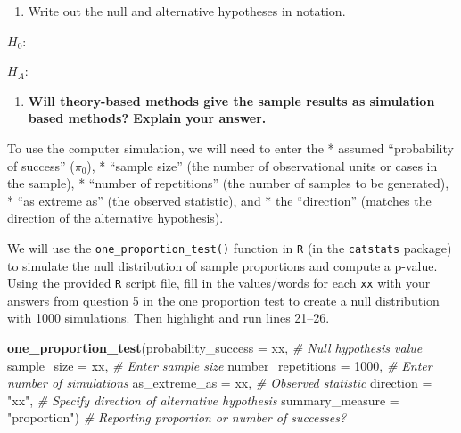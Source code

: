\documentclass[
]{report}
\newenvironment{Shaded}{\begin{snugshade}}{\end{snugshade}}
\newcommand{\AttributeTok}[1]{\textcolor[rgb]{0.13,0.29,0.53}{#1}}
\newcommand{\CommentTok}[1]{\textcolor[rgb]{0.56,0.35,0.01}{\textit{#1}}}
\newcommand{\DecValTok}[1]{\textcolor[rgb]{0.00,0.00,0.81}{#1}}
\newcommand{\FunctionTok}[1]{\textcolor[rgb]{0.13,0.29,0.53}{\textbf{#1}}}
\newcommand{\NormalTok}[1]{#1}
\newcommand{\StringTok}[1]{\textcolor[rgb]{0.31,0.60,0.02}{#1}}
\providecommand{\tightlist}{%
  \setlength{\itemsep}{0pt}\setlength{\parskip}{0pt}}
\begin{document}
\vspace{0.5in}

\begin{enumerate}
\def\labelenumi{\arabic{enumi}.}
\setcounter{enumi}{3}
\tightlist
\item
  Write out the null and alternative hypotheses in notation.
\end{enumerate}

\vspace{1mm}

\(H_0:\)

\vspace{0.3in}

\(H_A:\)

\vspace{0.3in}

\begin{enumerate}
\def\labelenumi{\arabic{enumi}.}
\setcounter{enumi}{4}
\tightlist
\item
  \textbf{Will theory-based methods give the sample results as simulation based methods? Explain your answer.}
\end{enumerate}

\vspace{0.6in}

To use the computer simulation, we will need to enter the
* assumed ``probability of success'' (\(\pi_0\)),
* ``sample size'' (the number of observational units or cases in the sample),
* ``number of repetitions'' (the number of samples to be generated),
* ``as extreme as'' (the observed statistic), and
* the ``direction'' (matches the direction of the alternative hypothesis).

We will use the \texttt{one\_proportion\_test()} function in \texttt{R} (in the \texttt{catstats} package) to simulate the null distribution of sample proportions and compute a p-value. Using the provided \texttt{R} script file, fill in the values/words for each \texttt{xx} with your answers from question 5 in the one proportion test to create a null distribution with 1000 simulations. Then highlight and run lines 21--26.

\begin{Shaded}
\begin{Highlighting}[]
\FunctionTok{one\_proportion\_test}\NormalTok{(}\AttributeTok{probability\_success =}\NormalTok{ xx, }\CommentTok{\# Null hypothesis value}
          \AttributeTok{sample\_size =}\NormalTok{ xx, }\CommentTok{\# Enter sample size}
          \AttributeTok{number\_repetitions =} \DecValTok{1000}\NormalTok{, }\CommentTok{\# Enter number of simulations}
          \AttributeTok{as\_extreme\_as =}\NormalTok{ xx, }\CommentTok{\# Observed statistic}
          \AttributeTok{direction =} \StringTok{"xx"}\NormalTok{, }\CommentTok{\# Specify direction of alternative hypothesis}
          \AttributeTok{summary\_measure =} \StringTok{"proportion"}\NormalTok{) }\CommentTok{\# Reporting proportion or number of successes?}
\end{Highlighting}
\end{Shaded}
\end{document}

